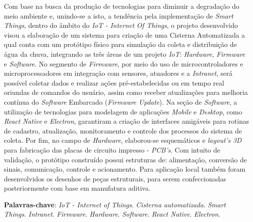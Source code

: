 
\begin{resumo}[RESUMO]
\begin{SingleSpacing}

 Com base na busca da produção de tecnologias para diminuir a degradação do meio ambiente e, unindo-se a isto, a tendência pela implementação de \textit{Smart Things}, dentro do âmbito do \textit{IoT - Internet Of Things},  o projeto desenvolvido visou a elaboração de um sistema para criação de uma Cisterna Automatizada a qual conta com um protótipo físico para simulação da coleta e distribuição de água da chuva, integrando as três áreas de um projeto \textit{IoT}: \textit{Hardware}, \textit{Firmware} e \textit{Software}. No segmento de \textit{Firmware}, por meio do uso de microcontroladores e microprocessadores em integração com sensores, atuadores e a \textit{Intranet}, será possível coletar dados e realizar ações pré-estabelecidas ou em tempo real oriundas de comandos do usuário, assim como receber atualizações para melhoria contínua do \textit{Software} Embarcado (\textit{Firmware Update}).  Na seção de \textit{Software}, a utilização de tecnologias para modelagem de aplicações \textit{Mobile} e \textit{Desktop}, como  \textit{React Native} e \textit{Electron},  garantiram a criação de interfaces amigáveis para rotinas de cadastro, atualização, monitoramento e controle dos processos do sistema de coleta. Por fim, no campo de \textit{Hardware}, elaborou-se esquemáticos e \textit{layout's 3D} para fabricação das placas de circuito impresso - \textit{PCB's}. Com intuito de validação, o protótipo construído possui estruturas de: alimentação, conversão de sinais, comunicação, controle e acionamento. Para aplicação local também foram desenvolvidos os desenhos de peças estruturais, para serem confeccionadas posteriormente com base em manufatura aditiva.
 
\vspace{\onelineskip}

\textbf{Palavras-chave}: \textit{IoT - Internet of Things}. \textit{Cisterna automatizada}. \textit{Smart Things}. \textit{Intranet}.   \textit{Firmware}. \textit{Hardware}. \textit{Software}. \textit{React Native}. \textit{Electron}.

\end{SingleSpacing}
\end{resumo}


